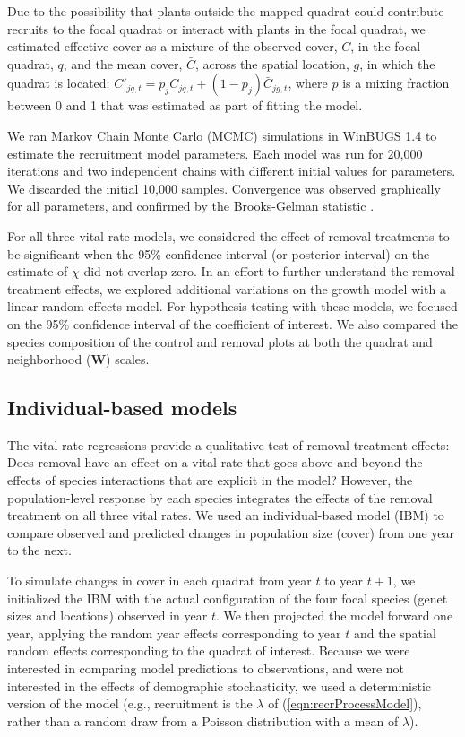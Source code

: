 \documentclass[11pt]{article}
\begin{document}
\begin{doublespacing}
Due to the possibility that plants outside the mapped quadrat could contribute recruits to the focal quadrat or interact with plants in the focal quadrat, we estimated effective cover as a mixture of the observed cover, $C$, in the focal quadrat, $q$, and the mean cover, $\bar{C}$, across the spatial location, $g$, in which the quadrat is located: $C'_{jq,t}=p_j C_{jq,t}+(1-p_j) \bar{C}_{jg,t}$, where $p$ is a mixing fraction between 0 and 1 that was estimated as part of fitting the model.

We ran Markov Chain Monte Carlo (MCMC) simulations in WinBUGS 1.4 \citep{lunn_winbugs_2000} to estimate the recruitment model parameters. Each model was run for 20,000 iterations and two independent chains with different initial values for parameters. We discarded the initial 10,000 samples. Convergence was observed graphically for all parameters, and confirmed by the Brooks-Gelman statistic \citep{brooks_general_1998}. 

For all three vital rate models, we considered the effect of removal treatments to be significant when the 95\% confidence interval (or posterior
interval) on the estimate of $\chi$ did not overlap zero. In an effort to further understand the removal treatment effects, we explored additional variations on the growth model with a linear random effects model. For hypothesis testing with these models, we focused on the 95\% confidence interval of the coefficient of interest. We also compared the species composition of the control and removal plots at both the quadrat and neighborhood ($\boldsymbol{W}$) scales.

\subsection*{Individual-based models}

The vital rate regressions provide a qualitative test of removal treatment effects: Does removal have an effect on a vital rate that goes above and beyond the effects of species interactions that are explicit in the model? However, the population-level response by each species integrates the effects of the removal treatment on all three vital rates. We used an individual-based model (IBM) to compare observed and predicted changes 
in population size (cover) from one year to the next. 

To simulate changes in cover in each quadrat from year $t$ to year $t+1$, we initialized the IBM with the actual configuration of the four focal species (genet sizes and locations) observed in year $t$. We then projected the model forward one year, applying the random year effects corresponding to year $t$ and the spatial random effects corresponding to the quadrat of interest. Because we were interested in comparing model predictions to observations, and were not interested in the effects of demographic stochasticity, we used a deterministic version of the model (e.g., recruitment is the $\lambda$ of (\ref{eqn:recrProcessModel}), rather than a random draw from a Poisson distribution with a mean of $\lambda$).


\end{doublespacing}
\end{document}
